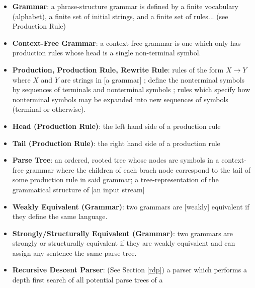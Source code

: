 \documentclass[11pt]{article}
\begin{document}
\begin{itemize}
\item \textbf{Grammar}: a phrase-structure grammar is defined by a finite vocabulary (alphabet), a finite set of
initial strings, and a finite set of rules... \cite{chomsky} (see Production Rule)
\item \textbf{Context-Free Grammar}: a context free grammar is one which only has production rules whose head is a single non-terminal symbol.
\cite{compiler, anatomy, formal_langs}
\item \textbf{Production, Production Rule, Rewrite Rule}: rules of the form $X \rightarrow Y$ where
$X$ and $Y$ are strings in [a grammar]  \cite{chomsky};
define the nonterminal symbols by sequences of terminals and nonterminal symbols \cite{compiler};
rules which specify how nonterminal symbols may be expanded into new sequences of symbols (terminal or otherwise).
\item \textbf{Head (Production Rule)}: the left hand side of a production rule
\item \textbf{Tail (Production Rule)}: the right hand side of a production rule
\item \textbf{Parse Tree}: an ordered, rooted tree whose nodes are symbols in a context-free grammar where the 
children of each brach node correspond to the tail of some production rule in said grammar;
a tree-representation of the grammatical structure of [an input stream] \cite{anatomy}
\item \textbf{Weakly Equivalent (Grammar)}: two grammars are [weakly] equivalent if they define the same language.\cite{reghizzi}
\item \textbf{Strongly/Structurally Equivalent (Grammar)}: two grammars are strongly or structurally equivalent
if they are weakly equivalent and can assign any sentence the same parse tree. \cite{reghizzi}
\item \textbf{Recursive Descent Parser}: (See Section \ref{rdp}) a parser which performs a depth first search of all potential parse trees of a 
\cite{compiler, lewis}
\end{itemize}


{}

\end{document}
